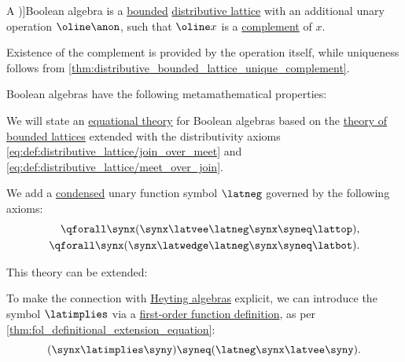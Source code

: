 \begin{definition}\label{def:boolean_algebra}
  A \term[ru=булева алгебра (\cite[def. 1.1]{Гуров2013ТеорияРешёток})]{Boolean algebra} is a \hyperref[def:extremal_points/bounds]{bounded} \hyperref[def:distributive_lattice]{distributive lattice} with an additional unary operation \( {\oline \anon} \), such that \( {\oline x} \) is a \hyperref[def:bounded_lattice_complement]{complement} of \( x \).

  Existence of the complement is provided by the operation itself, while uniqueness follows from \cref{thm:distributive_bounded_lattice_unique_complement}.

  Boolean algebras have the following metamathematical properties:
  \begin{thmenum}
    \mimprovised We will state an \hyperref[def:fol_equational_theory]{equational theory} for Boolean algebras based on the \hyperref[def:bounded_lattice/theory]{theory of bounded lattices} extended with the distributivity axioms \eqref{eq:def:distributive_lattice/join_over_meet} and \eqref{eq:def:distributive_lattice/meet_over_join}.

    \begin{thmenum}[series=def:boolean_algebra/theory]
       We add a \hyperref[def:fol_signature/notation]{condensed} unary function symbol \( {\latneg} \) governed by the following axioms:
      \begin{align}
        \qforall \synx (\synx \latvee \latneg \synx   &\syneq \lattop), \label{eq:def:boolean_algebra/theory/complement/join} \\
        \qforall \synx (\synx \latwedge \latneg \synx &\syneq \latbot). \label{eq:def:boolean_algebra/theory/complement/meet}
      \end{align}
    \end{thmenum}

    This theory can be extended:
    \begin{thmenum}[resume=def:boolean_algebra/theory]
       To make the connection with \hyperref[def:heyting_algebra]{Heyting algebras} explicit, we can introduce the symbol \( {\latimplies} \) via a \hyperref[def:fol_definition/function]{first-order function definition}, as per \cref{thm:fol_definitional_extension_equation}:
      \begin{equation}\label{eq:def:boolean_algebra/theory/relative}
        (\synx \latimplies \syny) \syneq (\latneg \synx \latvee \syny).
      \end{equation}


\end{thmenum}
\end{thmenum}
\end{definition}
